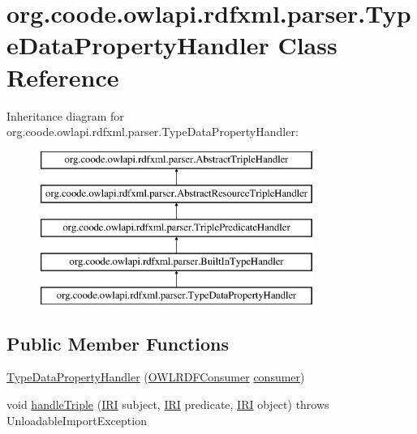 \hypertarget{classorg_1_1coode_1_1owlapi_1_1rdfxml_1_1parser_1_1_type_data_property_handler}{\section{org.\-coode.\-owlapi.\-rdfxml.\-parser.\-Type\-Data\-Property\-Handler Class Reference}
\label{classorg_1_1coode_1_1owlapi_1_1rdfxml_1_1parser_1_1_type_data_property_handler}
}
Inheritance diagram for org.\-coode.\-owlapi.\-rdfxml.\-parser.\-Type\-Data\-Property\-Handler\-:\begin{figure}[H]
\begin{center}
\leavevmode
\includegraphics[height=5.000000cm]{classorg_1_1coode_1_1owlapi_1_1rdfxml_1_1parser_1_1_type_data_property_handler}
\end{center}
\end{figure}
\subsection*{Public Member Functions}
\begin{DoxyCompactItemize}
\item 
\hyperlink{classorg_1_1coode_1_1owlapi_1_1rdfxml_1_1parser_1_1_type_data_property_handler_a62fe5d071b915509eca3304e784e632e}{Type\-Data\-Property\-Handler} (\hyperlink{classorg_1_1coode_1_1owlapi_1_1rdfxml_1_1parser_1_1_o_w_l_r_d_f_consumer}{O\-W\-L\-R\-D\-F\-Consumer} \hyperlink{classorg_1_1coode_1_1owlapi_1_1rdfxml_1_1parser_1_1_abstract_triple_handler_a4ccf4d898ff01eb1cadfa04b23d54e9c}{consumer})
\item 
void \hyperlink{classorg_1_1coode_1_1owlapi_1_1rdfxml_1_1parser_1_1_type_data_property_handler_abf97c53fb5c61953964349d66ca0e213}{handle\-Triple} (\hyperlink{classorg_1_1semanticweb_1_1owlapi_1_1model_1_1_i_r_i}{I\-R\-I} subject, \hyperlink{classorg_1_1semanticweb_1_1owlapi_1_1model_1_1_i_r_i}{I\-R\-I} predicate, \hyperlink{classorg_1_1semanticweb_1_1owlapi_1_1model_1_1_i_r_i}{I\-R\-I} object)  throws Unloadable\-Import\-Exception 
\end{DoxyCompactItemize}
